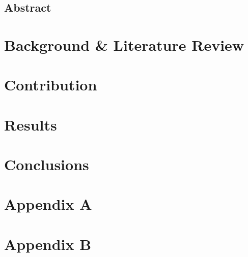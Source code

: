 \documentclass[12pt]{report}
\theoremstyle{plain}
\theoremstyle{definition}
\begin{document}
\tableofcontents

\chapter*{Abstract}


\part{Background \& Literature Review}


\part{Contribution}



\part{Results}


\part{Conclusions}


\part{Appendix A} %


\part{Appendix B} %

\printbibliography
\end{document}
